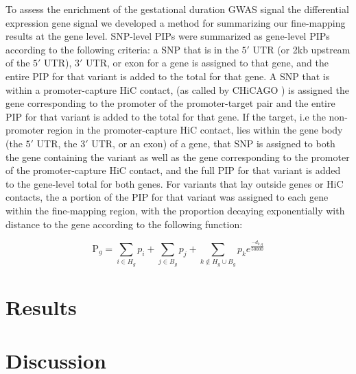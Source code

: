 To assess the enrichment of the gestational duration GWAS signal the differential expression gene signal we developed a method for summarizing our fine-mapping results at the gene level.  SNP-level PIPs were summarized as gene-level PIPs according to the following criteria:  a SNP that is in the \(5'\) UTR (or 2kb upstream of the \(5'\) UTR), \(3'\) UTR, or exon for a gene is assigned to that gene, and the entire PIP for that variant is added to the total for that gene.
A SNP that is within a promoter-capture HiC contact, (as called by CHiCAGO \cite{chicago}) is assigned the gene corresponding to the promoter of the promoter-target pair and the entire PIP for that variant is added to the total for that gene.  If the target, i.e the non-promoter region in the promoter-capture HiC contact, lies within the gene body (the \(5'\) UTR, the \(3'\) UTR, or an exon) of a gene, that SNP is assigned to both the gene containing the variant
as well as the gene corresponding to the promoter of the promoter-capture HiC contact, and the full PIP for that variant is added to the gene-level total for both genes.
For variants that lay outside genes or HiC contacts, the a portion of the PIP for that variant was assigned to each gene within the fine-mapping region, with the proportion decaying exponentially with distance to the gene according
to the following function:

$$\text{P}_{g} = \sum_{i \in H_g}  p_i + \sum_{j \in B_g} p_j + \sum_{k \not\in H_g \cup B_g} p_ke^{\frac{-d_{k,g}}{50000}} $$

\section{Results}\label{sec:orgb8d6bf0}


\section{Discussion}\label{sec:org53f1196}

